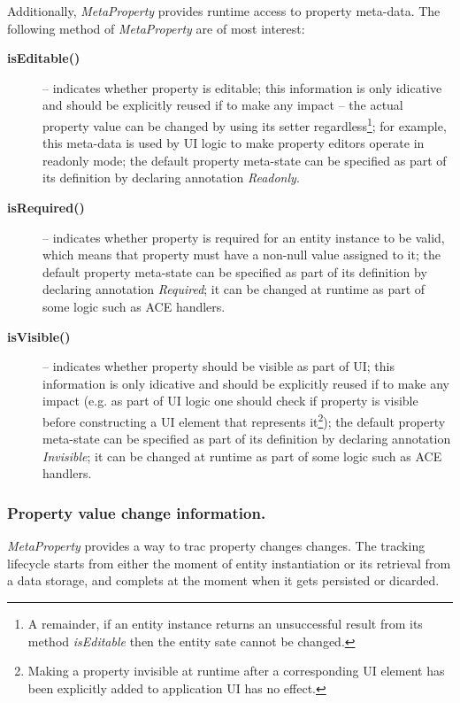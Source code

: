   Additionally, \emph{MetaProperty} provides runtime access to property meta-data.
  The following method of \emph{MetaProperty} are of most interest:
  \begin{description}
    \item[\textbf{isEditable()}] -- indicates whether property is editable; this information is only idicative and should be explicitly reused if to make any impact -- the actual property value can be changed by using its setter regardless\footnote{A remainder, if an entity instance returns an unsuccessful result from its method \emph{isEditable} then the entity sate cannot be changed.}; for example, this meta-data is used by UI logic to make property editors operate in readonly mode; the default property meta-state can be specified as part of its definition by declaring annotation \emph{Readonly}.
    \item[\textbf{isRequired()}] -- indicates whether property is required for an entity instance to be valid, which means that property must have a non-null value assigned to it; the default property meta-state can be specified as part of its definition by declaring annotation \emph{Required}; it can be changed at runtime as part of some logic such as ACE handlers.
    \item[\textbf{isVisible()}] -- indicates whether property should be visible as part of UI; this information is only idicative and should be explicitly reused if to make any impact (e.g. as part of UI logic one should check if property is visible before constructing a UI element that represents it\footnote{Making a property invisible at runtime after a corresponding UI element has been explicitly added to application UI has no effect.}); the default property meta-state can be specified as part of its definition by declaring annotation \emph{Invisible}; it can be changed at runtime as part of some logic such as ACE handlers.
  \end{description}  


  \subsubsection*{Property value change information.}
  
  \emph{MetaProperty} provides a way to trac property changes changes.
  The tracking lifecycle starts from either the moment of entity instantiation or its retrieval from a data storage, and complets at the moment when it gets persisted or dicarded.

